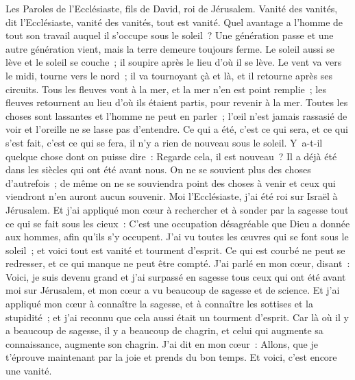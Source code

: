 \begin{multicols}{2}
\VerseOne{}Les Paroles de l'Ecclésiaste, fils de David, roi de Jérusalem.
Vanité des vanités, dit l'Ecclésiaste, vanité des vanités, tout est vanité.
Quel avantage a l'homme de tout son travail auquel il s'occupe sous le soleil~?
Une génération passe et une autre génération vient, mais la terre demeure toujours ferme.
Le soleil aussi se lève et le soleil se couche~; il soupire après le lieu d'où il se lève.
Le vent va vers le midi, tourne vers le nord~; il va tournoyant çà et là, et il retourne après ses circuits.
Tous les fleuves vont à la mer, et la mer n'en est point remplie~; les fleuves retournent au lieu d'où ils étaient partis, pour revenir à la mer.
Toutes les choses sont lassantes et l'homme ne peut en parler~; l'œil n'est jamais rassasié de voir et l'oreille ne se lasse pas d'entendre.
Ce qui a été, c'est ce qui sera, et ce qui s'est fait, c'est ce qui se fera, il n'y a rien de nouveau sous le soleil.
Y~a-t-il quelque chose dont on puisse dire~: Regarde cela, il est nouveau~? Il a déjà été dans les siècles qui ont été avant nous.
On ne se souvient plus des choses d'autrefois~; de même on ne se souviendra point des choses à venir et ceux qui viendront n'en auront aucun souvenir.
Moi l'Ecclésiaste, j'ai été roi sur Israël à Jérusalem.
Et j'ai appliqué mon cœur à rechercher et à sonder par la sagesse tout ce qui se fait sous les cieux~: C'est une occupation désagréable que Dieu a donnée aux hommes, afin qu'ils s'y occupent.
J'ai vu toutes les œuvres qui se font sous le soleil~; et voici tout est vanité et tourment d'esprit.
Ce qui est courbé ne peut se redresser, et ce qui manque ne peut être compté.
J'ai parlé en mon cœur, disant~: Voici, je suis devenu grand et j'ai surpassé en sagesse tous ceux qui ont été avant moi sur Jérusalem, et mon cœur a vu beaucoup de sagesse et de science.
Et j'ai appliqué mon cœur à connaître la sagesse, et à connaître les sottises et la stupidité~; et j'ai reconnu que cela aussi était un tourment d'esprit.
Car là où il y a beaucoup de sagesse, il y a beaucoup de chagrin, et celui qui augmente sa connaissance, augmente son chagrin.
\VerseOne{}J'ai dit en mon cœur~: Allons, que je t'éprouve maintenant par la joie et prends du bon temps. Et voici, c'est encore une vanité.

\end{multicols}
